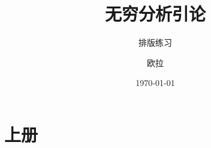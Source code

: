 \documentclass[
  10pt,
  twoside,
  openany,
  b5paper, %
  colorscheme = basic, %
]{qyxf-book}
\title{无穷分析引论}
\subtitle{排版练习}  %
\author{欧拉}
\date{\today}
\begin{document}
\maketitle






\tableofcontents

\mainmatter

\part{上册}










% 
% 
% 
% 
% 
% 
% 
% 

% 
% 
% 
% 
% 
% 
% 
% 
% 
% 
% 
% 
% 
% 
% 
% 
% 
% 
% 
% 
% 
% 
% 
% 
% 
% 
% 
% 
% 
\end{document}
